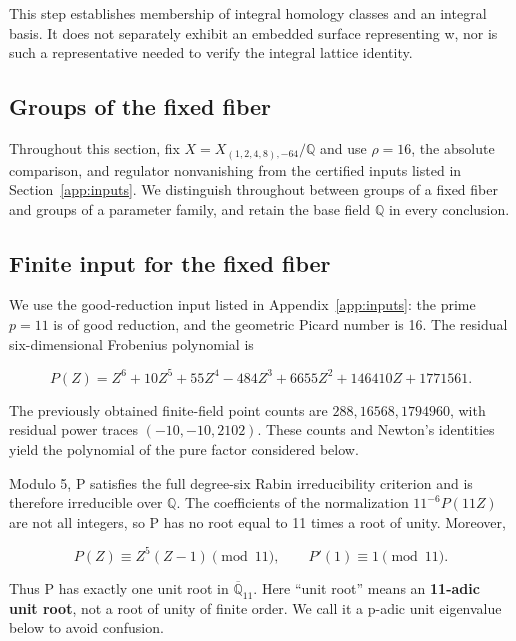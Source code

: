 \documentclass[11pt,a4paper,oneside]{article}
\theoremstyle{plain}
\theoremstyle{definition}
\theoremstyle{remark}
\newcommand{\Q}{\mathbb Q}
\numberwithin{equation}{section}
\begin{document}
This step establishes membership of integral homology classes and an integral basis. It does not separately exhibit an embedded surface representing w, nor is such a representative needed to verify the integral lattice identity.



\endgroup

\subsection*{Groups of the fixed fiber}

\begingroup

Throughout this section, fix $X=X_{(1,2,4,8),-64}/\Q$ and use $\rho=16$, the absolute comparison, and regulator nonvanishing from the certified inputs listed in Section~\ref{app:inputs}. We distinguish throughout between groups of a fixed fiber and groups of a parameter family, and retain the base field $\Q$ in every conclusion.

\subsection{Finite input for the fixed fiber}\label{sec:fixed:1}

We use the good-reduction input listed in Appendix~\ref{app:inputs}: the prime \(p=11\) is of good reduction, and the geometric Picard number is 16. The residual six-dimensional Frobenius polynomial is

\begin{equation}
P(Z)=Z^6+10Z^5+55Z^4-484Z^3+6655Z^2+146410Z+1771561.             \label{eq:fixed:3}
\end{equation}

The previously obtained finite-field point counts are \(288,16568,1794960\), with residual power traces \((-10,-10,2102)\). These counts and Newton's identities yield the polynomial of the pure factor considered below.

Modulo 5, P satisfies the full degree-six Rabin irreducibility criterion and is therefore irreducible over \(\mathbb Q\). The coefficients of the normalization \(11^{-6}P(11Z)\) are not all integers, so P has no root equal to 11 times a root of unity. Moreover,

\begin{equation}
P(Z)\equiv Z^5(Z-1)\pmod {11},\qquad P'(1)\equiv1\pmod {11}.     \label{eq:fixed:4}
\end{equation}

Thus P has exactly one unit root in \(\overline{\mathbb Q}_{11}\). Here ``unit root'' means an \textbf{11-adic unit root}, not a root of unity of finite order. We call it a p-adic unit eigenvalue below to avoid confusion.
\end{document}
